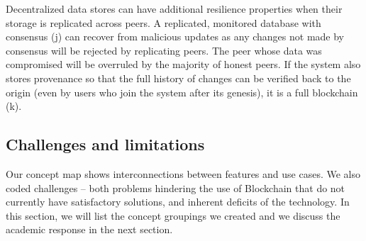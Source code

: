 {Decentralized data stores can have additional resilience properties when their storage is replicated across peers. A replicated, monitored database with consensus (j) can recover from malicious updates as any changes not made by consensus will be rejected by replicating peers. The peer whose data was compromised will be overruled by the majority of honest peers. If the system also stores provenance so that the full history of changes can be verified back to the origin (even by users who join the system after its genesis), it is a full blockchain (k).



\subsection{Challenges and limitations}
\label{subsec:challenges}


Our concept map shows interconnections between features and use cases. We also coded challenges -- both problems hindering the use of Blockchain that do not currently have satisfactory solutions, and inherent deficits of the technology. In this section, we will list the concept groupings we created and we discuss the academic response in the next section.
}
